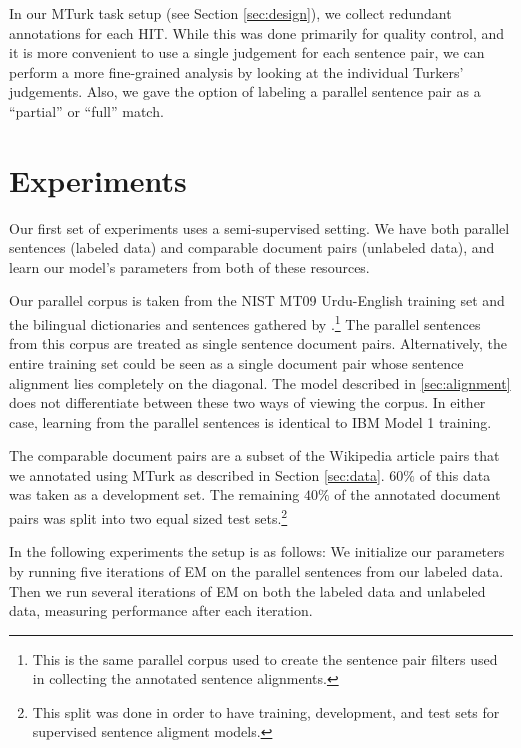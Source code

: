 In our MTurk task setup (see Section \ref{sec:design}), we collect redundant
annotations for each HIT. While this was done primarily for quality control, and
it is more convenient to use a single judgement for each sentence pair, we can
perform a more fine-grained analysis by looking at the individual Turkers'
judgements. Also, we gave the option of labeling a parallel sentence pair as a
``partial'' or ``full'' match.


\section{Experiments}
\label{sec:unsup_experiments}
Our first set of experiments uses a semi-supervised setting. We have both
parallel sentences (labeled data) and comparable document pairs (unlabeled data),
and learn our model's parameters from both of these resources.

Our parallel corpus is taken from the NIST MT09 Urdu-English training set
and the bilingual dictionaries and sentences gathered by
\citet{Post12}.\footnote{This is the same parallel corpus used to create the
sentence pair filters used in collecting the annotated sentence alignments.}
The parallel sentences from this corpus are treated as single sentence document
pairs. Alternatively, the entire training set could be seen as a single document
pair whose sentence alignment lies completely on the diagonal. The model
described in \ref{sec:alignment} does not differentiate between these two ways
of viewing the corpus. In either case, learning from the parallel sentences is
identical to IBM Model 1 training.

The comparable document pairs are a subset of the Wikipedia article pairs that
we annotated using MTurk as described in Section \ref{sec:data}. $60\%$ of this
data was taken as a development set. The remaining $40\%$ of the annotated
document pairs was split into two equal sized test sets.\footnote{This split was
done in order to have training, development, and test sets for supervised
sentence aligment models.}

In the following experiments the setup is as follows: We initialize our
parameters by running five iterations of EM on the parallel sentences from our
labeled data. Then we run several iterations of EM on both the labeled data and
unlabeled data, measuring performance after each iteration.

